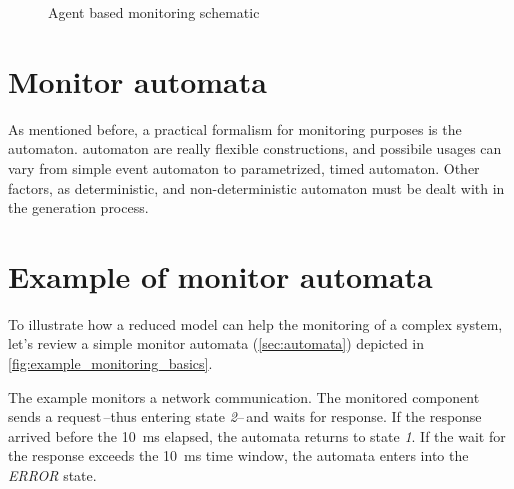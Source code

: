 \begin{figure}[h]
	\centering

	\caption{Agent based monitoring schematic}
\label{fig:agent_based_monitoring}
\end{figure}

\section{Monitor automata}

As mentioned before, a practical formalism for monitoring purposes is the automaton. automaton are really flexible constructions, and possibile usages can vary from simple event automaton to parametrized, timed automaton. Other factors, as deterministic, and non-deterministic automaton must be dealt with in the generation process.

\section{Example of monitor automata}

To illustrate how a reduced model can help the monitoring of a complex system, let's review a simple monitor automata (\cref{sec:automata}) depicted in \cref{fig:example_monitoring_basics}.

The example monitors a network communication. The monitored component sends a request\,--thus entering state \emph{2}--\,and waits for response. If the response arrived before the \SI{10}{\ms} elapsed, the automata returns to state \emph{1}. If the wait for the response exceeds the \SI{10}{ms} time window, the automata enters into the \emph{ERROR} state.

